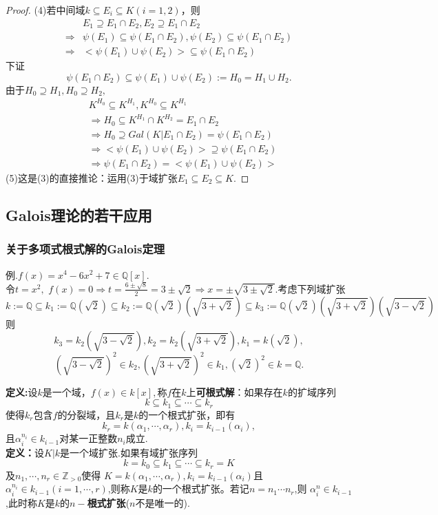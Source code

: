 \documentclass[UTF8]{article}
\begin{document}
\begin{proof}
	(4)若中间域$k\subseteq E_{i}\subseteq K(i=1,2)$，则
	\[
	\begin{split}
	&E_{1}\supseteq E_{1}\cap E_{2},E_{2}\supseteq E_{1}\cap E_{2}\\
	\Rightarrow&\psi(E_{1})\subseteq \psi(E_{1}\cap E_{2}),\psi(E_{2})\subseteq \psi(E_{1}\cap E_{2})\\
	\Rightarrow&<\psi(E_{1})\cup \psi(E_{2})>\subseteq \psi(E_{1}\cap E_{2})
	\end{split}
	\]
	下证
	$$
	\psi(E_{1}\cap E_{2})\subseteq \psi(E_{1})\cup \psi(E_{2}):=H_{0}=H_{1}\cup H_{2}.
	$$
	由于$H_{0}\supseteq H_{1},H_{0}\supseteq H_{2},$
	\[
	\begin{split}
	&K^{H_{0}}\subseteq K^{H_{1}},K^{H_{0}}\subseteq K^{H_{1}}\\
	&\Rightarrow H_{0}\subseteq K^{H_{1}}\cap K^{H_{2}}=E_{1}\cap E_{2}\\
	&\Rightarrow H_{0}\supseteq Gal(K|E_{1}\cap E_{2})=\psi(E_{1}\cap E_{2})\\
	&\Rightarrow< \psi(E_{1})\cup \psi(E_{2})>\supseteq  \psi(E_{1}\cap E_{2})\\
	&\Rightarrow\psi(E_{1}\cap E_{2})=< \psi(E_{1})\cup \psi(E_{2})>
	\end{split}
	\]
	(5)这是(3)的直接推论：运用(3)于域扩张$E_{1}\subseteq E_{2}\subseteq K.$
\end{proof}
\subsection{Galois理论的若干应用}
\subsubsection{关于多项式根式解的Galois定理}
例.$f(x)=x^{4}-6x^{2}+7\in \mathbb{Q}[x].$\\
令$t=x^{2},$ $f(x)=0\Rightarrow t=\frac{6\pm\sqrt{8}}{2}=3\pm \sqrt{2}\Rightarrow x=\pm\sqrt{3\pm \sqrt{2}}$.考虑下列域扩张
$$
k:=\mathbb{Q}\subseteq k_{1}:=\mathbb{Q}(\sqrt{2})\subseteq k_{2}:=\mathbb{Q}(\sqrt{2})(\sqrt{3+\sqrt{2}})\subseteq k_{3}:=\mathbb{Q}(\sqrt{2})(\sqrt{3+\sqrt{2}})(\sqrt{3-\sqrt{2}})
$$
则
$$k_{3}=k_{2}(\sqrt{3-\sqrt{2}}),k_{2}=k_{2}(\sqrt{3+\sqrt{2}}),k_{1}=k(\sqrt{2}),$$
$$
(\sqrt{3-\sqrt{2}})^{2}\in k_{2},(\sqrt{3+\sqrt{2}})^{2}\in k_{1},(\sqrt{2})^{2}\in k=\mathbb{Q}.
$$

\textbf{定义:}设$k$是一个域，$f(x)\in k[x],$称$f$在$k$上\textbf{可根式解}：如果存在$k$的扩域序列
$$
k\subseteq k_{1}\subseteq \cdots\subseteq k_{r}
$$
使得$k_{r}$包含$f$的分裂域，且$k_{r}$是$k$的一个根式扩张，即有$$k_{r}=k(\alpha_{1},\cdots,\alpha_{r}),k_{i}=k_{i-1}(\alpha_{i}),$$
且$\alpha_{i}^{n_{i}}\in k_{i-1}$对某一正整数$n_{i}$成立.\\
\textbf{定义：}设$K|k$是一个域扩张.如果有域扩张序列
$$
k=k_{0}\subseteq k_{1}\subseteq \cdots\subseteq k_{r}=K
$$
及$n_{1},\cdots,n_{r}\in \mathbb{Z}_{>0}$使得
$K=k(\alpha_{1},\cdots,\alpha_{r}),k_{i}=k_{i-1}(\alpha_{i})$且$\alpha_{i}^{n_{i}}\in k_{i-1}(i=1,\cdots,r)$,则称$K$是$k$的一个根式扩张。若记$n=n_{1}\cdots n_{r}$,则
$\alpha_{i}^{n}\in k_{i-1}$,此时称$K$是$k$的$n-$\textbf{根式扩张}($n$不是唯一的).\\
\end{document}
